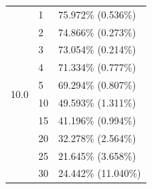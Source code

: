 \documentclass[conference,compsoc]{IEEEtran}
\begin{document}
\begin{table}[ht]
\begin{tabular}{lll}
    \multirow{10}{*}{10.0} & 1 & 75.972\% (0.536\%) \\
    & 2 & 74.866\% (0.273\%) \\
    & 3 & 73.054\% (0.214\%) \\
    & 4 & 71.334\% (0.777\%) \\
    & 5 & 69.294\% (0.807\%) \\
    & 10 & 49.593\% (1.311\%) \\
    & 15 & 41.196\% (0.994\%) \\
    & 20 & 32.278\% (2.564\%) \\
    & 25 & 21.645\% (3.658\%) \\
    & 30 & 24.442\% (11.040\%) \\
    \hline
    \end{tabular}
\end{table}
\end{document}
